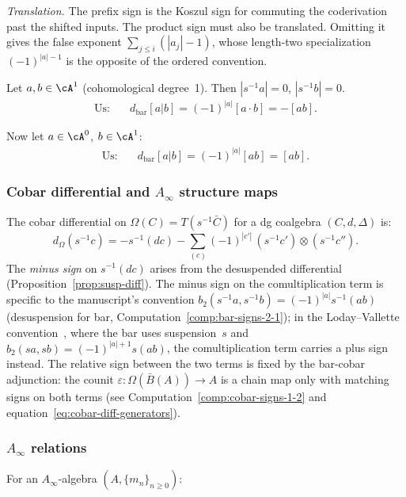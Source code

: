 \emph{Translation.} The prefix sign is the Koszul sign for commuting the
coderivation past the shifted inputs. The product sign must also be
translated. Omitting it gives the false exponent
$\sum_{j\le i}(|a_j|-1)$, whose length-two specialization
$(-1)^{|a|-1}$ is the opposite of the ordered convention.

\begin{example}
Let $a, b \in \cA^1$ (cohomological degree~1). Then $|s^{-1}a| = 0$,
$|s^{-1}b| = 0$.
\begin{align*}
\text{Us:} &\quad d_{\mathrm{bar}}[a|b]
 = (-1)^{|a|}[a\cdot b] = -[ab].
\end{align*}

Now let $a \in \cA^0$, $b \in \cA^1$:
\begin{align*}
\text{Us:} &\quad d_{\mathrm{bar}}[a|b]
 = (-1)^{|a|}[ab] = [ab].
\end{align*}
\end{example}

\subsubsection{Cobar differential and $A_\infty$ structure maps}

The cobar differential on $\Omega(C) = T(s^{-1}\bar{C})$ for a dg coalgebra $(C, d, \Delta)$ is:
\[
d_\Omega(s^{-1}c) = -s^{-1}(dc)
 - \sum_{(c)} (-1)^{|c'|}\, (s^{-1}c') \otimes (s^{-1}c'').
\]
The \emph{minus sign} on $s^{-1}(dc)$ arises from the desuspended differential
(Proposition~\ref{prop:susp-diff}). The minus sign on the comultiplication
term is specific to the manuscript's convention
$b_2(s^{-1}a,s^{-1}b) = (-1)^{|a|}s^{-1}(ab)$
(desuspension for bar, Computation~\ref{comp:bar-signs-2-1});
in the Loday--Vallette convention~\cite[\S2.2]{LV12}, where the bar uses
suspension~$s$ and $b_2(sa,sb) = (-1)^{|a|+1}s(ab)$, the comultiplication
term carries a plus sign instead. The relative sign between the two terms
is fixed by the bar-cobar adjunction: the counit
$\varepsilon\colon \Omega(\bar B(A)) \to A$ is a chain map only with
matching signs on both terms
(see Computation~\ref{comp:cobar-signs-1-2} and
equation~\eqref{eq:cobar-diff-generators}).

\subsubsection{$A_\infty$ relations}

For an $A_\infty$-algebra $(A, \{m_n\}_{n\geq 0})$:

